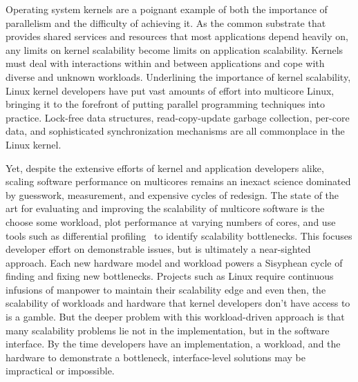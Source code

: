 Operating system kernels are a poignant example of both the importance
of parallelism and the difficulty of achieving it.
%
As the common substrate that provides shared services and resources
that most applications depend heavily on, any limits on kernel
scalability become limits on application scalability.
%
Kernels must deal with interactions within and between applications
and cope with diverse and unknown workloads.
%
%
Underlining the importance of kernel scalability, Linux kernel
developers have put vast amounts of effort into multicore Linux,
bringing it to the forefront of putting parallel programming
techniques into practice.  Lock-free data structures, read-copy-update
garbage collection, per-core data, and sophisticated synchronization
mechanisms are all commonplace in the Linux kernel.

Yet, despite the extensive efforts of kernel and application
developers alike, scaling software performance on multicores remains
an inexact science dominated by guesswork, measurement, and expensive
cycles of redesign.
%
The state of the art for evaluating and improving the scalability of
multicore software is the choose some workload, plot performance at
varying numbers of cores, and use tools such as differential
profiling~\cite{mckenney:differential} to identify scalability
bottlenecks.    
%
This focuses developer effort on demonstrable issues, but is
ultimately a near-sighted approach.
%
%
Each new hardware model and workload powers a Sisyphean cycle of
finding and fixing new bottlenecks.
%
Projects such as Linux require continuous infusions of manpower to
maintain their scalability edge and even then, the scalability of
workloads and hardware that kernel developers don't have access to is
a gamble.
%
But the deeper problem with this workload-driven approach is that many
scalability problems lie not in the implementation, but in the
software interface.  By the time developers have an implementation, a
workload, and the hardware to demonstrate a bottleneck,
interface-level solutions may be impractical or impossible.

